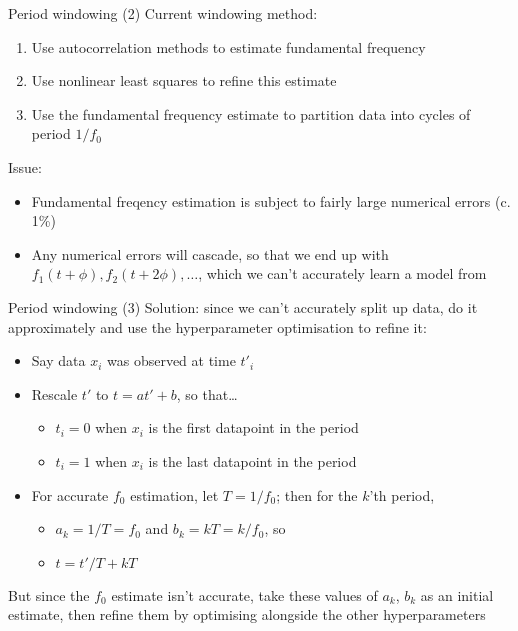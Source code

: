 \documentclass[presentation]{beamer}
\begin{document}
\begin{frame}[label={sec:orgad5d32b}]{Period windowing (2)}
Current windowing method:
\begin{enumerate}
\item Use autocorrelation methods to estimate fundamental frequency
\item Use nonlinear least squares to refine this estimate
\item Use the fundamental frequency estimate to partition data into cycles of period \(1/f_0\)
\end{enumerate}

Issue:
\begin{itemize}
\item Fundamental freqency estimation is subject to fairly large numerical errors (c. 1\%)
\item Any numerical errors will cascade, so that we end up with \(f_1(t+\phi), f_2(t+2\phi),\dots\), which we can't accurately learn a model from
\end{itemize}
\end{frame}


\begin{frame}[label={sec:org2511904}]{Period windowing (3)}
Solution: since we can't accurately split up data, do it approximately and use the hyperparameter optimisation to refine it:

\begin{itemize}
\item Say data \(x_i\) was observed at time \(t'_i\)
\item Rescale \(t'\) to \(t = at' + b\), so that\ldots{}
\begin{itemize}
\item \(t_i=0\) when \(x_i\) is the first datapoint in the period
\item \(t_i=1\) when \(x_i\) is the last datapoint in the period
\end{itemize}
\item For accurate \(f_0\) estimation, let \(T = 1/f_0\); then for the \(k\)'th period,
\begin{itemize}
\item \(a_k = 1/T = f_0\) and \(b_k = kT = k/f_0\), so
\item \(t = t'/T + kT\)
\end{itemize}
\end{itemize}

But since the \(f_0\) estimate isn't accurate, take these values of \(a_k\), \(b_k\) as an initial estimate, then refine them by optimising alongside the other hyperparameters
\end{frame}
\end{document}

